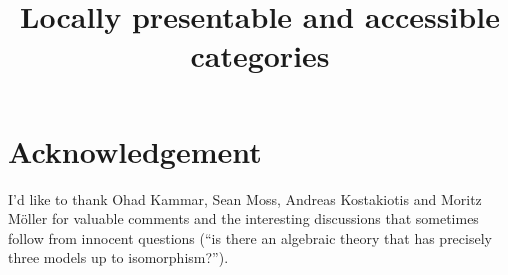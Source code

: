 \documentclass[11pt,a4paper]{article}
\title{Locally presentable and accessible categories}
\date{}
\theoremstyle{margin}
\theoremstyle{nonumberplain}
\begin{document}
\maketitle
\pagebreak
\tableofcontents
\pagebreak


\parindent0cm


 \pagebreak
 \pagebreak

\section*{Acknowledgement}
I'd like to thank Ohad Kammar, Sean Moss, Andreas Kostakiotis and Moritz Möller for valuable comments and the interesting discussions that sometimes follow from innocent questions (``is there an algebraic theory that has precisely three models up to isomorphism?'').


\nocite{*}


\printbibliography[title=Bibliography]
\end{document}
